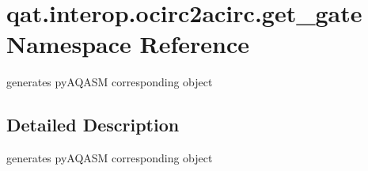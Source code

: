 \hypertarget{namespaceqat_1_1interop_1_1ocirc2acirc_1_1get__gate}{\section{qat.\-interop.\-ocirc2acirc.\-get\-\_\-gate Namespace Reference}
\label{namespaceqat_1_1interop_1_1ocirc2acirc_1_1get__gate}
}


generates py\-A\-Q\-A\-S\-M corresponding object  




\subsection{Detailed Description}
generates py\-A\-Q\-A\-S\-M corresponding object 
